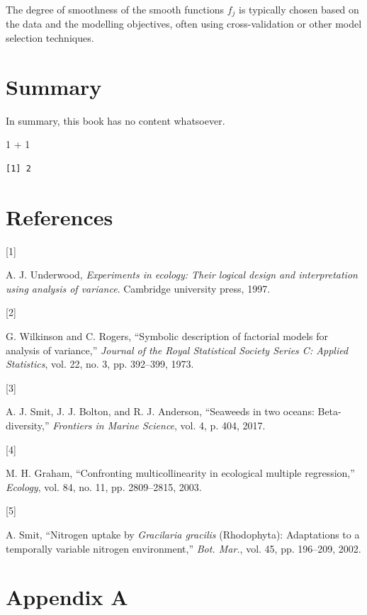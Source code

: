 \documentclass[
  letterpaper,
]{book}
\newenvironment{Shaded}{\begin{snugshade}}{\end{snugshade}}
\newcommand{\DecValTok}[1]{\textcolor[rgb]{0.68,0.00,0.00}{#1}}
\newcommand{\SpecialCharTok}[1]{\textcolor[rgb]{0.37,0.37,0.37}{#1}}
\newlength{\cslhangindent}
\newlength{\csllabelwidth}
\newenvironment{CSLReferences}[2] %
 {\begin{list}{}{%
  \setlength{\itemindent}{0pt}
  \setlength{\leftmargin}{0pt}
  \setlength{\parsep}{0pt}
  \ifodd #1
   \setlength{\leftmargin}{\cslhangindent}
   \setlength{\itemindent}{-1\cslhangindent}
  \fi
  \setlength{\itemsep}{#2\baselineskip}}}
 {\end{list}}
\newcommand{\CSLLeftMargin}[1]{\parbox[t]{\csllabelwidth}{\strut#1\strut}}
\newcommand{\CSLRightInline}[1]{\parbox[t]{\linewidth - \csllabelwidth}{\strut#1\strut}}
\begin{document}
The degree of smoothness of the smooth functions \(f_j\) is typically
chosen based on the data and the modelling objectives, often using
cross-validation or other model selection techniques.


\chapter{Summary}\label{summary}

In summary, this book has no content whatsoever.

\begin{Shaded}
\begin{Highlighting}[]
\DecValTok{1} \SpecialCharTok{+} \DecValTok{1}
\end{Highlighting}
\end{Shaded}

\begin{verbatim}
[1] 2
\end{verbatim}


\chapter*{References}\label{references}


\label{refs}
\begin{CSLReferences}{0}{0}
\CSLLeftMargin{{[}1{]} }%
\CSLRightInline{A. J. Underwood, \emph{Experiments in ecology: Their
logical design and interpretation using analysis of variance}. Cambridge
university press, 1997.}

\CSLLeftMargin{{[}2{]} }%
\CSLRightInline{G. Wilkinson and C. Rogers, {``Symbolic description of
factorial models for analysis of variance,''} \emph{Journal of the Royal
Statistical Society Series C: Applied Statistics}, vol. 22, no. 3, pp.
392--399, 1973.}

\CSLLeftMargin{{[}3{]} }%
\CSLRightInline{A. J. Smit, J. J. Bolton, and R. J. Anderson,
{``Seaweeds in two oceans: Beta-diversity,''} \emph{{Frontiers in Marine
Science}}, vol. 4, p. 404, 2017.}

\CSLLeftMargin{{[}4{]} }%
\CSLRightInline{M. H. Graham, {``Confronting multicollinearity in
ecological multiple regression,''} \emph{Ecology}, vol. 84, no. 11, pp.
2809--2815, 2003.}

\CSLLeftMargin{{[}5{]} }%
\CSLRightInline{A. Smit, {``Nitrogen uptake by \emph{{Gracilaria}
gracilis} ({Rhodophyta}): Adaptations to a temporally variable nitrogen
environment,''} \emph{Bot. Mar.}, vol. 45, pp. 196--209, 2002.}

\end{CSLReferences}

\cleardoublepage
{}
{}
\appendix

\chapter{Appendix A}\label{appendix-a}


\backmatter

\printindex
\end{document}
